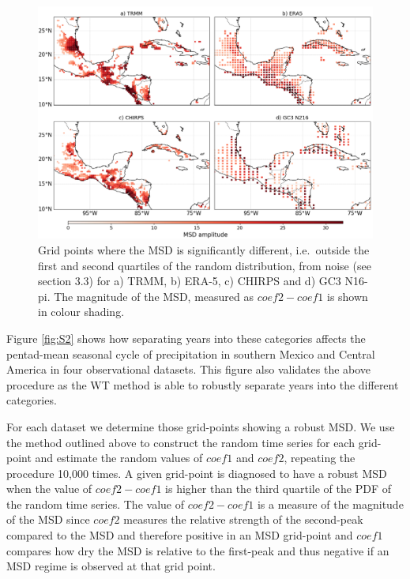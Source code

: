 \begin{figure}[t!]
\centering
\includegraphics[width=\linewidth]{figures/wav_fig12.png}
\caption[Map of MSD significant regions]{Grid points where the MSD is significantly different, i.e.\, outside the first and second quartiles of the random distribution, from noise (see section 3.3) for a) TRMM, b) ERA-5, c) CHIRPS and d) GC3 N16-pi.  The magnitude of the MSD, measured as $coef2-coef1$ is shown in colour shading.  }
\label{fig:wavfinalmap}
\end{figure} 
 
 Figure \ref{fig:S2} shows how separating years into these categories affects the pentad-mean seasonal cycle of precipitation in southern Mexico and Central America in four observational datasets. This figure also validates the above procedure as the WT method is able to robustly separate years into the different categories. 


For each dataset we determine those grid-points showing a robust MSD. We use the method outlined above to construct the random time series for each grid-point and estimate the random values of $coef1$ and $coef2$, repeating the procedure 10,000 times. A given grid-point is diagnosed to have a robust MSD when the value of $coef2-coef1$ is higher than the third quartile of the PDF of the random time series. The value of $coef2-coef1$ is a measure of the magnitude of the MSD since $coef2$ measures the relative strength of the second-peak compared to the MSD and therefore positive in an MSD grid-point and $coef1$ compares how dry the MSD is relative to the first-peak and thus negative if an MSD regime is observed at that grid point. 


